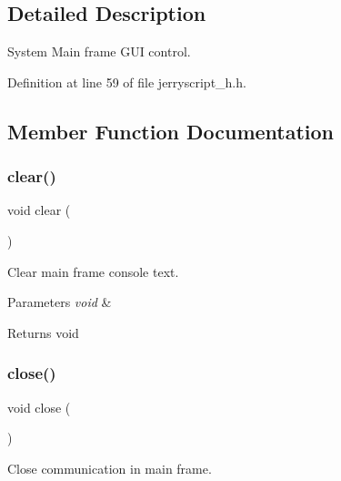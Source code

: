 \subsection{Detailed Description}
System Main frame G\+UI control. 

Definition at line 59 of file jerryscript\+\_\+h.\+h.



\subsection{Member Function Documentation}
\mbox{\label{classmain__frame_ae683fe63c33c388e9ba1c6392dd477eb}} 
\subsubsection{clear()}
{\footnotesize\ttfamily void clear (\begin{DoxyParamCaption}\item[{void}]{ }\end{DoxyParamCaption})}



Clear main frame console text. 


\begin{DoxyCode}{0}
\end{DoxyCode}



\begin{DoxyParams}{Parameters}
{\em void} & \\
\hline
\end{DoxyParams}
\begin{DoxyReturn}{Returns}
void 
\end{DoxyReturn}
\mbox{\label{classmain__frame_a67b72387b99fb35706b11eeba7070bc4}} 
\subsubsection{close()}
{\footnotesize\ttfamily void close (\begin{DoxyParamCaption}\item[{void}]{ }\end{DoxyParamCaption})}



Close communication in main frame. 


